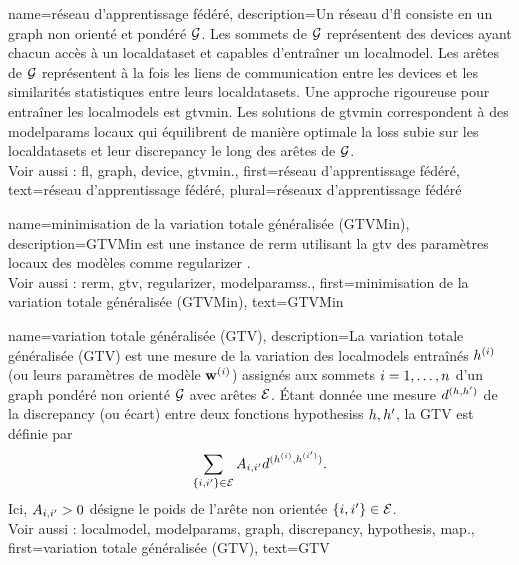 {name={réseau d’apprentissage fédéré},
	description={Un réseau d'\gls{fl} consiste en un 
		\gls{graph} non orienté et pondéré $\mathcal{G}$. Les sommets de $\mathcal{G}$ représentent des \glspl{device} 
		ayant chacun accès à un \gls{localdataset} et capables d’entraîner un \gls{localmodel}. Les arêtes de $\mathcal{G}$ 
		représentent à la fois les liens de communication entre les \glspl{device} et les similarités statistiques 
		entre leurs \glspl{localdataset}. Une approche rigoureuse pour entraîner les \glspl{localmodel} est 
		\gls{gtvmin}. Les solutions de \gls{gtvmin} correspondent à des \gls{modelparams} locaux qui équilibrent 
		de manière optimale la \gls{loss} subie sur les \glspl{localdataset} et leur \gls{discrepancy} le long des arêtes de $\mathcal{G}$.
		\\
		Voir aussi : \gls{fl}, \gls{graph}, \gls{device}, \gls{gtvmin}.},
	first={réseau d’apprentissage fédéré},
	text={réseau d'apprentissage fédéré}, plural={réseaux d'apprentissage fédéré}
}

{name={minimisation de la variation totale généralisée (GTVMin)},
	description={GTVMin est une instance 
		de \gls{rerm} utilisant la \gls{gtv} des paramètres locaux des modèles comme \gls{regularizer} 
		\cite{ClusteredFLTVMinTSP}.
		\\
		Voir aussi : \gls{rerm}, \gls{gtv}, \gls{regularizer}, \glspl{modelparams}.},
	first={minimisation de la variation totale généralisée (GTVMin)},
	text={GTVMin}
}

{name={variation totale généralisée (GTV)}, 
	description={La variation totale généralisée (GTV) est une mesure de la variation des \glspl{localmodel} entraînés $h^{(i)}$ (ou leurs paramètres de modèle $\mathbf{w}^{(i)}$) assignés aux sommets $i=1, \ldots, n$ d’un \gls{graph} pondéré non orienté $\mathcal{G}$ avec arêtes $\mathcal{E}$. Étant donnée une mesure $d^{(h,h')}$ de la \gls{discrepancy} (ou écart) entre deux fonctions \glspl{hypothesis} $h,h'$, la GTV est définie par
		\begin{equation}
			\nonumber
			\sum_{\{i,i'\}\in \mathcal{E}} A_{i,i'} 
			d^{(h^{(i)},h^{(i')})}.
		\end{equation}
		Ici, $A_{i,i'}>0$ désigne le poids de l’arête non orientée $\{i,i'\}\in \mathcal{E}$.
		\\
		Voir aussi : \gls{localmodel}, \gls{modelparams}, \gls{graph}, \gls{discrepancy}, \gls{hypothesis}, \gls{map}.},
	first={variation totale généralisée (GTV)},
	text={GTV}
}

